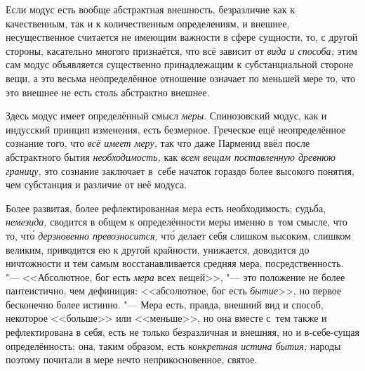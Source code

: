 Если модус есть вообще абстрактная внешность, безразличие как к качественным,
так и к количественным определениям, и внешнее, несущественное считается не
имеющим важности в сфере сущности, то, с другой стороны, касательно многого
признаётся, что всё зависит от {\em вида и способа;} этим сам модус объявляется
существенно принадлежащим к субстанциальной стороне вещи, а это весьма
неопределённое отношение означает по меньшей мере то, что это внешнее не есть
столь абстрактно внешнее.

Здесь модус имеет определённый смысл {\em меры}. Спинозовский модус,
как и индусский принцип изменения, есть безмерное. Греческое ещё
неопределённое сознание того, что {\em всё имеет меру,} так что даже
Парменид ввёл после абстрактного бытия {\em необходимость,} как
{\em всем вещам поставленную древнюю границу,} это сознание
заключает в~себе начаток гораздо более высокого понятия, чем
субстанция и различие от неё модуса.

Более развитая, более рефлектированная мера есть необходимость; судьба,
{\em немезида,} сводится в общем к определённости меры именно в~том смысле,
что то, чт\'{о} {\em дерзновенно превозносится,} чт\'{о} делает себя слишком
высоким, слишком великим, приводится ею к другой крайности, унижается,
доводится до ничтожности и тем самым восстанавливается средняя мера,
посредственность. "--- <<Абсолютное, бог есть {\em мера} всех вещей>>, "--- это
положение не более пантеистично, чем дефиниция: <<абсолютное, бог есть
{\em бытие}>>, но первое бесконечно более истинно. "--- Мера есть, правда,
внешний вид и способ, некоторое <<больше>> или <<меньше>>, но она вместе с~тем
также и рефлектирована в себя, есть не только безразличная и внешняя, но и
в-себе-сущая определённость; она, таким образом, есть {\em конкретная истина
бытия;} народы поэтому почитали в мере нечто неприкосновенное, святое.

